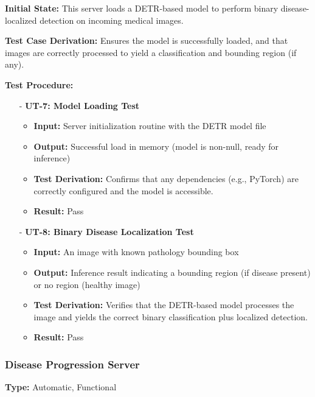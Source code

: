 \documentclass[12pt, titlepage]{article}
\begin{document}
\noindent \textbf{Initial State:}
This server loads a DETR-based model to perform binary disease-localized detection on incoming medical images.
\vspace{10pt}

\noindent \textbf{Test Case Derivation:}
Ensures the model is successfully loaded, and that images are correctly processed to yield a classification and bounding region (if any).
\vspace{10pt}

\noindent \textbf{Test Procedure:}
\begin{itemize}
    \item[-] \textbf{UT-7: Model Loading Test} \label{test:diseasepred-model-loading}
    \begin{itemize}
      \item \textbf{Input:} Server initialization routine with the DETR model file
      \item \textbf{Output:} Successful load in memory (model is non-null, ready for inference)
      \item \textbf{Test Derivation:} Confirms that any dependencies (e.g., PyTorch) are correctly configured and the model is accessible.
      \item \textbf{Result:} Pass
    \end{itemize}

    \item[-] \textbf{UT-8: Binary Disease Localization Test} \label{test:diseasepred-binary-localization}
    \begin{itemize}
      \item \textbf{Input:} An image with known pathology bounding box
      \item \textbf{Output:} Inference result indicating a bounding region (if disease present) or no region (healthy image)
      \item \textbf{Test Derivation:} Verifies that the DETR-based model processes the image and yields the correct binary classification plus localized detection.
      \item \textbf{Result:} Pass
    \end{itemize}
\end{itemize}


\subsubsection{Disease Progression Server}
\textbf{Type:} Automatic, Functional
\vspace{10pt}
\end{document}
